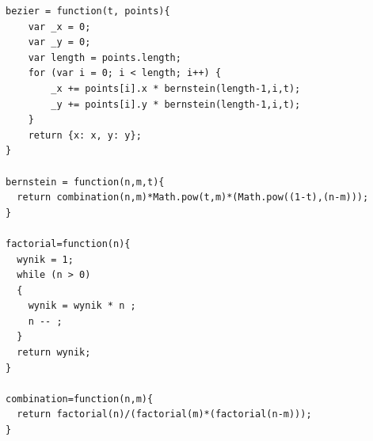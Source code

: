 \lstset{language=JavaScript}
\begin{lstlisting}[label={lst:aproks},caption={Aproksymacja danych}]
bezier = function(t, points){
	var _x = 0;
	var _y = 0;
	var length = points.length;
	for (var i = 0; i < length; i++) {
		_x += points[i].x * bernstein(length-1,i,t);
		_y += points[i].y * bernstein(length-1,i,t);
	}
	return {x: x, y: y};
}

bernstein = function(n,m,t){
  return combination(n,m)*Math.pow(t,m)*(Math.pow((1-t),(n-m)));
}

factorial=function(n){
  wynik = 1;
  while (n > 0)
  {
    wynik = wynik * n ;
    n -- ;
  }
  return wynik;
}

combination=function(n,m){
  return factorial(n)/(factorial(m)*(factorial(n-m)));
}

\end{lstlisting}
